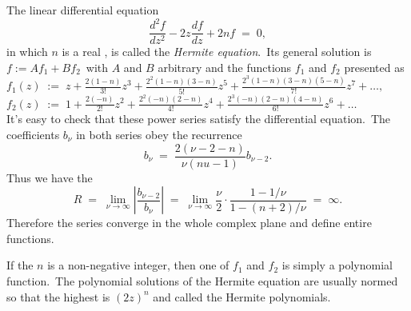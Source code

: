 \documentclass[12pt]{article}
\theoremstyle{definition}
\begin{document}
The linear differential equation 
        $$\frac{d^2f}{dz^2}-2z\frac{df}{dz}+2nf \;=\; 0,$$
in which $n$ is a real , is called the {\em Hermite equation}.\, Its general solution is\, $f := Af_1\!+\!Bf_2$\, with $A$ and $B$ arbitrary  and the functions $f_1$ and $f_2$ presented as\\

\quad $f_1(z) \;:=\; z+\frac{2(1-n)}{3!}z^3+\frac{2^2(1-n)(3-n)}{5!}z^5+
\frac{2^3(1-n)(3-n)(5-n)}{7!}z^7+\ldots\!,$\\

\quad $f_2(z) \;:=\; 1+\frac{2(-n)}{2!}z^2+\frac{2^2(-n)(2-n)}{4!}z^4+
\frac{2^3(-n)(2-n)(4-n)}{6!}z^6+\ldots$\\

It's easy to check that these power series satisfy the differential equation.\, The coefficients $b_\nu$ in both series obey the recurrence 
    $$b_\nu \;=\; \frac{2(\nu\!-\!2\!-\!n)}{\nu(nu\!-\!1)}b_{\nu\!-\!2}.$$
Thus we have the 
 $$R \;=\; \lim_{\nu\to\infty}\left|\frac{b_{\nu-2}}{b_\nu}\right| \;=\; 
\lim_{\nu\to\infty}\frac{\nu}{2}\!\cdot\!\frac{1\!-\!1/\nu}{1\!-\!(n\!+\!2)/\nu} \;=\; \infty.$$
Therefore the series converge in the whole complex plane and define entire functions.

If the  $n$ is a non-negative integer, then one of $f_1$ and $f_2$ is simply a polynomial function.\, The polynomial solutions of the Hermite equation are usually normed so that the highest   is $(2z)^n$ and called the Hermite polynomials.
\end{document}
